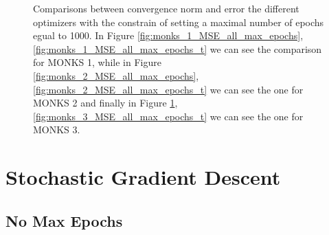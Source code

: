 \begin{appendices}
\begin{figure}[b!]
\begin{subfigure}{0.45\textwidth}
{                    }
                    \caption{}
                    \label{fig:monks_3_MSE_all_max_epochs}
                \end{subfigure}
                \caption{Comparisons between convergence norm and error the different optimizers with the constrain of setting a
                maximal number of epochs egual to 1000. In Figure \ref{fig:monks_1_MSE_all_max_epochs}, \ref{fig:monks_1_MSE_all_max_epochs_t}
                we can see the comparison for MONKS 1, while in Figure \ref{fig:monks_2_MSE_all_max_epochs}, \ref{fig:monks_2_MSE_all_max_epochs_t}
                we can see the one for MONKS 2 and finally in Figure \ref{fig:monks_3_MSE_all_max_epochs}, \ref{fig:monks_3_MSE_all_max_epochs_t} we
                can see the one for MONKS 3.}
                \label{fig:monks_MSE_all_max_epochs}
            \end{figure}


        \clearpage
        \section{Stochastic Gradient Descent} %
        \label{sec:stochastic_gradient_descent}
            
            \subsection{No Max Epochs}


\end{appendices}
